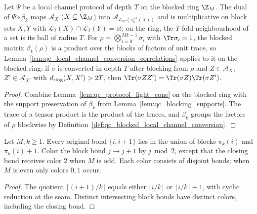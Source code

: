 \begin{lemma}
    \label{lem:qc_blocked_conversion_light_cone}
    \leanok
    Let $\Psi$ be a local channel protocol of depth $T$ on the blocked ring $\Z_M$. The dual of
    $\Psi\circ\beta_k$ maps $\mathcal A_X$ ($X\subseteq\Z_M$) into
    $\mathcal A_{\mathcal L_{kT}(\pi_k^{-1}(X))}$ and is multiplicative on block sets $X,Y$ with
    $\mathcal L_T(X)\cap\mathcal L_T(Y)=\varnothing$; on the ring, the $T$-fold neighbourhood of a
    set is its ball of radius $T$. For $\rho=\bigotimes_{i=0}^{Mk-1}\sigma_i$ with
    $\Tr\sigma_i=1$, the blocked matrix $\beta_k(\rho)$ is a product over the blocks of factors of
    unit trace, so Lemma~\ref{lem:qc_local_channel_conversion_correlations} applies to it on the
    blocked ring: if $\sigma$ is converted in depth $T$ after blocking from $\rho$ and
    $Z\in\mathcal A_X$, $Z'\in\mathcal A_{X'}$ with $d_{\rm ring}(X,X')>2T$, then
    $\Tr(\sigma ZZ')=\Tr(\sigma Z)\Tr(\sigma Z')$.
\end{lemma}
\begin{proof}
    \leanok
    Combine Lemma~\ref{lem:qc_protocol_light_cone} on the blocked ring with the support
    preservation of $\beta_k$ from Lemma~\ref{lem:qc_blocking_supports}. The trace of a tensor
    product is the product of the traces, and $\beta_k$ groups the factors of $\rho$ blockwise by
    Definition~\ref{def:qc_blocked_local_channel_conversion}.
\end{proof}

\begin{lemma}
    \label{lem:qc_regrouped_matching_schedule}
    \leanok
    Let $M,k\ge1$. Every original bond $\{i,i+1\}$ lies in the union of blocks
    $\pi_k(i)$ and $\pi_k(i)+1$. Color the block bond $j\to j+1$ by $j\bmod2$,
    except that the closing bond receives color $2$ when $M$ is odd.
    Each color consists of disjoint bonds; when $M$ is even only colors $0,1$ occur.
\end{lemma}
\begin{proof}
    \leanok
    The quotient $\lfloor(i+1)/k\rfloor$ equals either $\lfloor i/k\rfloor$ or
    $\lfloor i/k\rfloor+1$, with cyclic reduction at the seam. Distinct intersecting block bonds
    have distinct colors, including the closing bond.
\end{proof}


